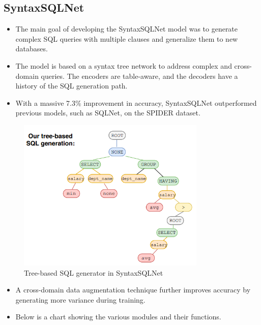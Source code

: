 \subsection*{SyntaxSQLNet}

\begin{itemize}
    \item The main goal of developing the SyntaxSQLNet model was to generate complex SQL queries with multiple clauses and generalize them to new databases.
    \item The model is based on a syntax tree network to address complex and cross-domain queries. The encoders are table-aware, and the decoders have a history of the SQL generation path.
    \item With a massive 7.3\% improvement in accuracy, SyntaxSQLNet outperformed previous models, such as SQLNet, on the SPIDER dataset.
\end{itemize}


\begin{figure}[htb]
    \centering
    \includegraphics[width=0.8\textwidth]{pics/SyntaxSQLNet/Tree-based.png}
    \caption{Tree-based SQL generator in SyntaxSQLNet}
    \label{fig:tree-based}
\end{figure}

\begin{itemize}
    \item A cross-domain data augmentation technique further improves accuracy by generating more variance during training.
    \item Below is a chart showing the various modules and their functions.
\end{itemize}

